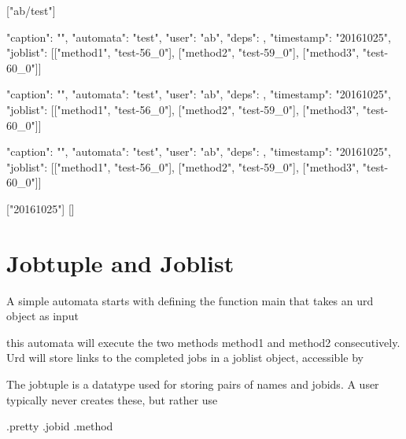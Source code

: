 \begin{shell}
["ab/test"]

{"caption": "", "automata": "test", "user": "ab", "deps": {},
  "timestamp": "20161025", "joblist": [["method1", "test-56_0"],
  ["method2", "test-59_0"], ["method3", "test-60_0"]]}

{"caption": "", "automata": "test", "user": "ab", "deps": {},
  "timestamp": "20161025", "joblist": [["method1", "test-56_0"],
  ["method2", "test-59_0"], ["method3", "test-60_0"]]}

{"caption": "", "automata": "test", "user": "ab", "deps": {},
  "timestamp": "20161025", "joblist": [["method1", "test-56_0"],
  ["method2", "test-59_0"], ["method3", "test-60_0"]]}

["20161025"]
[]                                 



\end{shell}









\section{Jobtuple and Joblist}

A simple automata starts with defining the function main that takes an
urd object as input

this automata will execute the two methods method1 and method2
consecutively.  Urd will store links to the completed jobs in a
joblist object, accessible by




The jobtuple is a datatype used for storing pairs of names and jobids.
A user typically never creates these, but rather use

\begin{python}

\end{python}


.pretty
.jobid
.method

